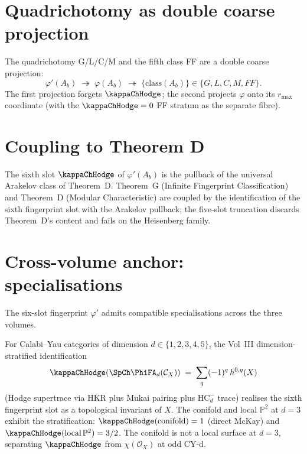 \section{Quadrichotomy as double coarse projection}
\label{sec:quadrichotomy-projection}

\begin{corollary}
\label{cor:double-coarse-projection}
The quadrichotomy G/L/C/M and the fifth class FF are a double coarse
projection:
\[
 \varphi'(A_b)
 \;\twoheadrightarrow\;
 \varphi(A_b)
 \;\twoheadrightarrow\;
 \{\text{class}(A_b)\} \in \{G, L, C, M, FF\}.
\]
The first projection forgets $\kappaChHodge$; the second projects
$\varphi$ onto its $r_{\max}$ coordinate (with the $\kappaChHodge = 0$
FF stratum as the separate fibre).
\end{corollary}

\section{Coupling to Theorem D}
\label{sec:fingerprint-theoremD-coupling}

\begin{remark}
\label{rem:fingerprint-theoremD-coupling}
The sixth slot $\kappaChHodge$ of $\varphi'(A_b)$ is the pullback of
the universal Arakelov class of Theorem~D. Theorem~G (Infinite
Fingerprint Classification) and Theorem~D (Modular Characteristic) are
coupled by the identification of the sixth fingerprint slot with the
Arakelov pullback; the five-slot truncation discards Theorem~D's
content and fails on the Heisenberg family.
\end{remark}

\section{Cross-volume anchor: specialisations}
\label{sec:fingerprint-anchor}

The six-slot fingerprint $\varphi'$ admits compatible specialisations
across the three volumes.

\begin{remark}
\label{rem:fingerprint-cy-d-stratification}
For Calabi--Yau categories of dimension $d \in \{1, 2, 3, 4, 5\}$, the
Vol~III dimension-stratified identification
\[
 \kappaChHodge(\SpCh \PhiFA_d(\mathcal{C}_X))
 \;=\;
 \sum_{q} (-1)^{q}\, h^{0,q}(X)
\]
(Hodge supertrace via HKR plus Mukai pairing plus $\mathrm{HC}^{-}_{d}$
trace) realises the sixth fingerprint slot as a topological invariant
of $X$. The conifold and local $\mathbb{P}^{2}$ at $d = 3$ exhibit the
stratification: $\kappaChHodge(\mathrm{conifold}) = 1$ (direct McKay)
and $\kappaChHodge(\mathrm{local}\,\mathbb{P}^{2}) = 3/2$. The conifold
is not a local surface at $d = 3$, separating $\kappaChHodge$ from
$\chi(\mathcal{O}_X)$ at odd CY-d.
\end{remark}

